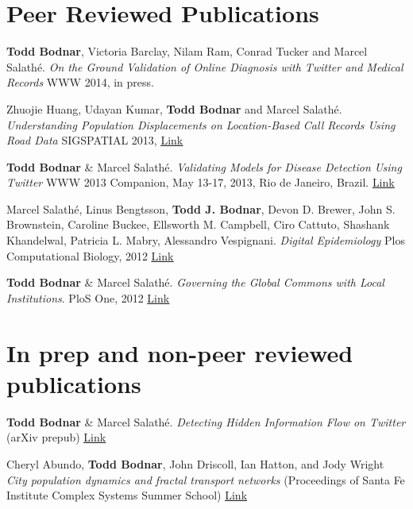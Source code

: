 \documentclass[margin,line]{res}
\newcommand{\linkToUrl}[1]{\underline{\color{blue} \href{#1}{Link}}}
\begin{document}
\begin{resume}
\section{\sc Peer Reviewed Publications}

\begin{etaremune}[start=5]

\item \textbf{Todd Bodnar}, Victoria Barclay, Nilam Ram, Conrad Tucker and Marcel Salath\'e. \textit{On the Ground Validation of Online Diagnosis with Twitter and Medical Records} WWW 2014, in press.

\item Zhuojie Huang, Udayan Kumar, \textbf{Todd Bodnar} and Marcel Salath\'e. \textit{Understanding Population Displacements on Location-Based Call Records Using Road Data} SIGSPATIAL 2013, \linkToUrl{http://bit.ly/1dAjC5o}

\item \textbf{Todd Bodnar} \& Marcel Salath\'e. \textit{Validating Models for Disease Detection Using Twitter}  WWW 2013 Companion, May 13-17, 2013, Rio de Janeiro, Brazil. \linkToUrl{http://bit.ly/WWL1Gr}

\item Marcel Salath\'e, Linus Bengtsson, \textbf{Todd J. Bodnar}, Devon D. Brewer, John S. Brownstein, Caroline Buckee, Ellsworth M. Campbell, Ciro Cattuto, Shashank Khandelwal, Patricia L. Mabry,  Alessandro Vespignani. \textit{Digital Epidemiology} Plos Computational Biology, 2012 \linkToUrl{http://bitly.com/PO2fSx}

\item \textbf{Todd Bodnar} \& Marcel Salath\'e. \textit{Governing the Global Commons with Local Institutions}. PloS One, 2012 \linkToUrl{http://bit.ly/TtsZd5}
\end{etaremune}

\section{\sc In prep and non-peer reviewed publications}

\begin{etaremune}[start=3]

\item \textbf{Todd Bodnar} \& Marcel Salath\'e. \textit{Detecting Hidden Information Flow on Twitter} (arXiv prepub) \linkToUrl{http://bit.ly/Yr965L}

\item Cheryl Abundo, \textbf{Todd Bodnar}, John Driscoll, Ian Hatton, and Jody Wright
 \textit{City population dynamics and fractal transport networks} (Proceedings of Santa Fe Institute Complex Systems Summer School) \linkToUrl{bit.ly/19A22vY}%


\end{etaremune}
\end{resume}
\end{document}
